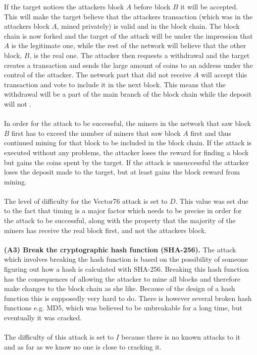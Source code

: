 \documentclass[frame, english]{idamasterthesis}
\begin{document}
\noindent
If the target notices the attackers block $A$ before block $B$ it will be accepted. This will make the target believe that the attackers transaction (which was in the attackers block $A$, mined privately) is valid and in the block chain. The block chain is now forked and the target of the attack will be under the impression that $A$ is the legitimate one, while the rest of the network will believe that the other block, $B$, is the real one. The attacker then requests a withdrawal and the target creates a transaction and sends the large amount of coins to an address under the control of the attacker. The network part that did not receive $A$ will accept this transaction and vote to include it in the next block. This means that the withdrawal will be a part of the main branch of the block chain while the deposit will not \cite{bitcoin-attacks}. \\\\
In order for the attack to be successful, the miners in the network that saw block $B$ first has to exceed the number of miners that saw block $A$ first and thus continued mining for that block to be included in the block chain. If the attack is executed without any problems, the attacker loses the reward for finding a block but gains the coins spent by the target. If the attack is unsuccessful the attacker loses the deposit made to the target, but at least gains the block reward from mining. \\\\
The level of difficulty for the Vector76 attack is set to $D$. This value was set due to the fact that timing is a major factor which needs to be precise in order for the attack to be successful, along with the property that the majority of the miners has receive the real block first, and not the attackers block. \\\\
\noindent
\textbf{(A3) Break the cryptographic hash function (SHA-256).} The attack which involves breaking the hash function is based on the possibility of someone figuring out how a hash is calculated with SHA-256. Breaking this hash function has the consequences of allowing the attacker to mine all blocks and therefore make changes to the block chain as she like. Because of the design of a hash function this is supposedly very hard to do. There is however several broken hash functions e.g. MD5, which was believed to be unbreakable for a long time, but eventually it was cracked. \\\\
The difficulty of this attack is set to $I$ because there is no known attacks to it and as far as we know no one is close to cracking it. \\
\end{document}
